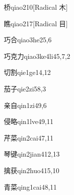 \begin{entry}{桥}{qiao2}{10}[Radical 木]
\end{entry}

\begin{entry}{瞧}{qiao2}{17}[Radical 目]
\end{entry}

\begin{entry}{巧合}{qiao3he2}{5,6}
\end{entry}

\begin{entry}{巧克力}{qiao3ke4li4}{5,7,2}
\end{entry}

\begin{entry}{切割}{qie1ge1}{4,12}
\end{entry}

\begin{entry}{茄子}{qie2zi5}{8,3}
\end{entry}

\begin{entry}{亲自}{qin1zi4}{9,6}
\end{entry}

\begin{entry}{侵略}{qin1lve4}{9,11}
\end{entry}

\begin{entry}{芹菜}{qin2cai4}{7,11}
\end{entry}

\begin{entry}{琴键}{qin2jian4}{12,13}
\end{entry}

\begin{entry}{擒获}{qin2huo4}{15,10}
\end{entry}

\begin{entry}{青菜}{qing1cai4}{8,11}
\end{entry}

